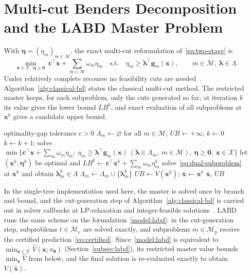 \section{Multi-cut Benders Decomposition and the LABD Master Problem}\label{app:classical-bd}

With $\boldsymbol\eta=(\eta_m)_{m\in\mathcal M}$, the exact multi-cut reformulation of~\eqref{eq:two-stage} is
\begin{equation}\label{eq:full-master}
\min_{\mathbf x\in\mathcal X,\ \boldsymbol\eta\ge\mathbf 0}\ \mathbf c^\top\mathbf x+\sum_{m\in\mathcal M}\omega_m\eta_m
\quad\text{s.t.}\quad \eta_m\ge\boldsymbol\lambda^\top\mathbf g_m(\mathbf x),\qquad m\in\mathcal M,\ \boldsymbol\lambda\in\Lambda .
\end{equation}
Under relatively complete recourse no feasibility cuts are needed~\cite{birge2006introduction}. Algorithm~\ref{alg:classical-bd} states the classical multi-cut method. The restricted master keeps, for each subproblem, only the cuts generated so far; at iteration $k$ its value gives the lower bound $LB^k$, and exact evaluation of all subproblems at $\mathbf x^k$ gives a candidate upper bound.

\begin{algorithm}[h]
\caption{Classical multi-cut Benders decomposition}\label{alg:classical-bd}
\begin{algorithmic}[1]
\Require optimality-gap tolerance $\epsilon>0$
\State $\Lambda_m\gets\varnothing$ for all $m\in\mathcal M$; $UB\gets+\infty$; $k\gets0$
\Loop
\State $k\gets k+1$; solve $\min\{\mathbf c^\top\mathbf x+\sum_m\omega_m\eta_m:\ \eta_m\ge\boldsymbol\lambda^\top\mathbf g_m(\mathbf x)\ (\boldsymbol\lambda\in\Lambda_m,\ m\in\mathcal M),\ \boldsymbol\eta\ge\mathbf 0,\ \mathbf x\in\mathcal X\}$
\State let $(\mathbf x^k,\boldsymbol\eta^k)$ be optimal and $LB^k\gets\mathbf c^\top\mathbf x^k+\sum_m\omega_m\eta_m^k$
\State solve~\eqref{eq:dual-subproblem} at $\mathbf x^k$ and obtain $\boldsymbol\lambda_m^k\in\Lambda$
 $\Lambda_m\gets\Lambda_m\cup\{\boldsymbol\lambda_m^k\}$ \EndIf
\EndFor
{} $UB\gets V(\mathbf x^k)$; $\bar{\mathbf x}\gets\mathbf x^k$ \EndIf
{} \Return $\bar{\mathbf x}$, $UB$ \EndIf
\EndLoop
\end{algorithmic}
\end{algorithm}

In the single-tree implementation used here, the master is solved once by branch and bound, and the cut-generation step of Algorithm~\ref{alg:classical-bd} is carried out in solver callbacks at LP-relaxation and integer-feasible solutions~\cite{rostami2022single,rostami2023convex}. LABD runs the same scheme on the formulation~\eqref{model:labd}: in the cut-generation step, subproblems $t\in\mathcal M_e$ are solved exactly, and subproblems $m\in\mathcal M_p$ receive the certified prediction~\eqref{eq:certified}. Since~\eqref{model:labd} is equivalent to $\min_{\mathbf x\in\mathcal X}\widehat V(\mathbf x;\pi_{\boldsymbol\theta})$ (Section~\ref{subsec:labd}), its restricted master value bounds $\min_{\mathbf x}\widehat V$ from below, and the final solution is re-evaluated exactly to obtain $V(\widehat{\mathbf x})$.

